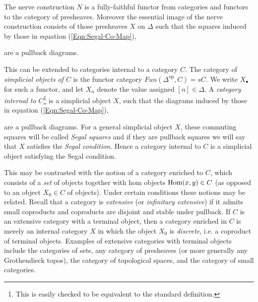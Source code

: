 \documentclass{amsart}
\begin{document}
The nerve construction $N$ is a fully-faithful functor from categories and functors to the category of presheaves. Moreover the essential image of the nerve construction consists of those presheaves $X$ on $\Delta$  such that the squares induced by those in equation (\ref{Eqn:Segal-Co-Map}),
\begin{center}
\end{center}
are a pullback diagrams. 

This can be extended to categories internal to a category $C$. The category of {\em simplicial objects of $C$} is the functor category $Fun(\Delta^\textrm{op}, C) = sC$. We write $X_\bullet$ for such a functor, and let $X_n$ denote the value assigned $[n] \in \Delta$. A {\em category internal to $C$}\footnote{This is easily checked to be equivalent to the standard definition.} is a simplicial object $X$, such that the diagrams induced by those in equation (\ref{Eqn:Segal-Co-Map}),
\begin{center}
\end{center}
are a pullback diagrams. For a general simplicial object $X$, these commuting squares will be called {\em Segal squares} and if they are pullback squares we will say that $X$ satisfies the {\em Segal condition}. Hence a category internal to $C$ is a simplicial object satisfying the Segal condition. 

This may be contrasted with the notion of a category enriched to $C$, which consists of a {\em set} of objects together with hom objects $\operatorname{Hom}(x,y) \in C$ (as opposed to an object $X_0 \in C$ of objects). Under certain conditions these notions may be related. Recall that a category is {\em extensive} (or {\em infinitary extensive}) if it admits small coproducts and coproducts are disjoint and stable under pullback. If $C$ is an extensive category with a terminal object, then a category enriched in $C$ is merely an internal category $X$ in which the object $X_0$ is {\em discrete}, i.e. a coproduct of terminal objects. Examples of extensive categories with terminal objects include the categories of sets, any category of presheaves (or more generally any Grothendieck topos), the category of topological spaces, and the category of small categories. 
\end{document}
